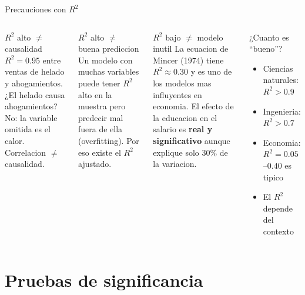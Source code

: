 \documentclass[aspectratio=169, 11pt]{beamer}
\begin{document}
\begin{frame}{Precauciones con $R^2$}
\small
\begin{columns}[T]
\begin{alertblock}{$R^2$ alto $\neq$ causalidad}
\footnotesize
$R^2 = 0.95$ entre ventas de helado y ahogamientos. ¿El helado causa ahogamientos? No: la variable omitida es el calor. Correlacion $\neq$ causalidad.
\end{alertblock}

\begin{alertblock}{$R^2$ alto $\neq$ buena prediccion}
\footnotesize
Un modelo con muchas variables puede tener $R^2$ alto en la muestra pero predecir mal fuera de ella (overfitting). Por eso existe el $R^2$ ajustado.
\end{alertblock}

\begin{exampleblock}{$R^2$ bajo $\neq$ modelo inutil}
\footnotesize
La ecuacion de Mincer (1974) tiene $R^2 \approx 0.30$ y es uno de los modelos mas influyentes en economia. El efecto de la educacion en el salario es \textbf{real y significativo} aunque explique solo 30\% de la variacion.
\end{exampleblock}

\begin{exampleblock}{¿Cuanto es ``bueno''?}
\footnotesize
\begin{itemize}\setlength{\itemsep}{0pt}
  \item Ciencias naturales: $R^2 > 0.9$
  \item Ingenieria: $R^2 > 0.7$
  \item Economia: $R^2 = 0.05$--$0.40$ es tipico
  \item El $R^2$ depende del contexto
\end{itemize}
\end{exampleblock}
\end{columns}
\end{frame}

\section{Pruebas de significancia}
\end{document}
